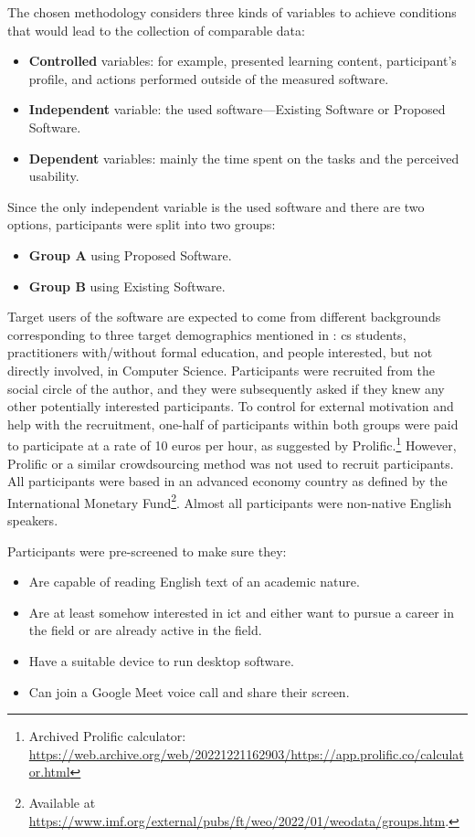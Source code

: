 The chosen methodology considers three kinds of variables to achieve conditions that would lead to the collection of comparable data:

\begin{itemize}
    \item \textbf{Controlled} variables: for example, presented learning content, participant's profile, and actions performed outside of the measured software.
    \item \textbf{Independent} variable: the used software---Existing Software or Proposed Software.
    \item \textbf{Dependent} variables: mainly the time spent on the tasks and the perceived usability.
\end{itemize}

Since the only independent variable is the used software and there are two options, participants were split into two groups:

\begin{itemize}
    \item \textbf{Group A} using Proposed Software.
    \item \textbf{Group B} using Existing Software.
\end{itemize}

Target users of the software are expected to come from different backgrounds corresponding to three target demographics mentioned in : \gls{cs} students, practitioners with/without formal education, and people interested, but not directly involved, in Computer Science.
Participants were recruited from the social circle of the author, and they were subsequently asked if they knew any other potentially interested participants.
To control for external motivation and help with the recruitment, one-half of participants within both groups were paid to participate at a rate of 10 euros per hour, as suggested by Prolific.\footnote{Archived Prolific calculator: \url{https://web.archive.org/web/20221221162903/https://app.prolific.co/calculator.html}}
However, Prolific or a similar crowdsourcing method was not used to recruit participants.
All participants were based in an advanced economy country as defined by the International Monetary Fund\footnote{Available at \url{https://www.imf.org/external/pubs/ft/weo/2022/01/weodata/groups.htm}.}.
Almost all participants were non-native English speakers.

Participants were pre-screened to make sure they:
\begin{itemize}
    \item Are capable of reading English text of an academic nature.
    \item Are at least somehow interested in \gls{ict} and either want to pursue a career in the field or are already active in the field.
    \item Have a suitable device to run desktop software.
    \item Can join a Google Meet voice call and share their screen.
\end{itemize}

